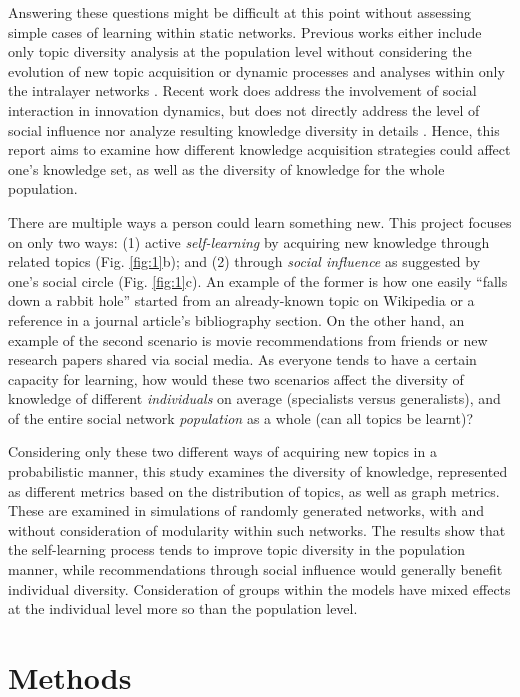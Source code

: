 \documentclass{svproc}
\begin{document}
Answering these questions might be difficult at this point without assessing simple cases of learning within static networks.
Previous works either include only topic diversity analysis at the population level without considering the evolution of new topic acquisition \cite{Weng2015-zt} or dynamic processes and analyses within only the intralayer networks \cite{Sun2020-qj}.
Recent work does address the involvement of social interaction in innovation dynamics, but does not directly address the level of social influence nor analyze resulting knowledge diversity in details \cite{Iacopini2020-jm}.
Hence, this report aims to examine how different knowledge acquisition strategies could affect one's knowledge set, as well as the diversity of knowledge for the whole population.

There are multiple ways a person could learn something new.
This project focuses on only two ways: (1) active \textit{self-learning} by acquiring new knowledge through related topics  (Fig. \ref{fig:1}b); and (2) through \textit{social influence} as suggested by one's social circle  (Fig. \ref{fig:1}c).
An example of the former is how one easily ``falls down a rabbit hole'' started from an already-known topic on Wikipedia or a reference in a journal article's bibliography section.
On the other hand, an example of the second scenario is movie recommendations from friends or new research papers shared via social media.
As everyone tends to have a certain capacity for learning, how would these two scenarios affect the diversity of knowledge of different \textit{individuals} on average (specialists versus generalists), and of the entire social network \textit{population} as a whole (can all topics be learnt)?

Considering only these two different ways of acquiring new topics in a probabilistic manner, this study examines the diversity of knowledge, represented as different metrics based on the distribution of topics, as well as graph metrics.
These are examined in simulations of randomly generated networks, with and without consideration of modularity within such networks.
The results show that the self-learning process tends to improve topic diversity in the population manner, while recommendations through social influence would generally benefit individual diversity.
Consideration of groups within the models have mixed effects at the individual level more so than the population level.

\section{Methods} \label{sec:method}
\end{document}
